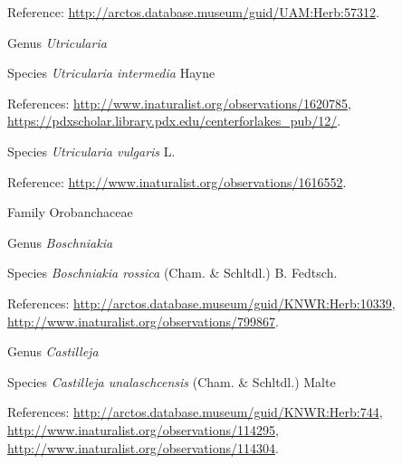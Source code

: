 \documentclass[9pt, article]{memoir}
\begin{document}
\begin{multicols}{2}
\vspace{6pt}Reference: 
\url{http://arctos.database.museum/guid/UAM:Herb:57312}.

\vspace{6pt}\noindent\hspace{30pt}Genus \textit{Utricularia}


\vspace{6pt}\noindent\hspace{36pt}Species \textit{Utricularia intermedia} Hayne


\vspace{6pt}References: 
\url{http://www.inaturalist.org/observations/1620785}, 
\url{https://pdxscholar.library.pdx.edu/centerforlakes_pub/12/}.

\vspace{6pt}\noindent\hspace{36pt}Species \textit{Utricularia vulgaris} L.


\vspace{6pt}Reference: 
\url{http://www.inaturalist.org/observations/1616552}.

\vspace{6pt}\noindent\hspace{24pt}Family Orobanchaceae


\vspace{6pt}\noindent\hspace{30pt}Genus \textit{Boschniakia}


\vspace{6pt}\noindent\hspace{36pt}Species \textit{Boschniakia rossica} (Cham. \& Schltdl.) B. Fedtsch.


\vspace{6pt}References: 
\url{http://arctos.database.museum/guid/KNWR:Herb:10339}, 
\url{http://www.inaturalist.org/observations/799867}.

\vspace{6pt}\noindent\hspace{30pt}Genus \textit{Castilleja}


\vspace{6pt}\noindent\hspace{36pt}Species \textit{Castilleja unalaschcensis} (Cham. \& Schltdl.) Malte


\vspace{6pt}References: 
\url{http://arctos.database.museum/guid/KNWR:Herb:744}, 
\url{http://www.inaturalist.org/observations/114295}, 
\url{http://www.inaturalist.org/observations/114304}.


\end{multicols}
\end{document}
